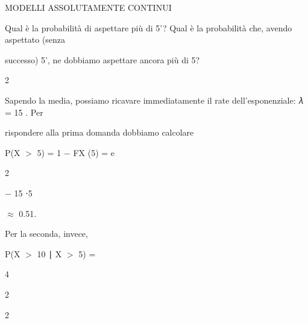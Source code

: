 \documentclass[a4paper,portrait,12pt]{article}
\begin{document}





\begin{flushleft}
MODELLI ASSOLUTAMENTE CONTINUI
\end{flushleft}





\begin{flushleft}
Qual \`{e} la probabilit\`{a} di aspettare più di 5'? Qual \`{e} la probabilit\`{a} che, avendo aspettato (senza
\end{flushleft}


\begin{flushleft}
successo) 5', ne dobbiamo aspettare ancora più di 5?
\end{flushleft}


2


\begin{flushleft}
Sapendo la media, possiamo ricavare immediatamente il rate dell'esponenziale: 𝜆 = 15 . Per
\end{flushleft}


\begin{flushleft}
rispondere alla prima domanda dobbiamo calcolare
\end{flushleft}


\begin{flushleft}
P(X $>$ 5) = 1 $-$ FX (5) = e
\end{flushleft}





2





$-$ 15 ⋅5





$\approx$ 0.51.





\begin{flushleft}
Per la seconda, invece,
\end{flushleft}


\begin{flushleft}
P(X $>$ 10 ∣ X $>$ 5) =
\end{flushleft}





4


2


2
\end{document}

